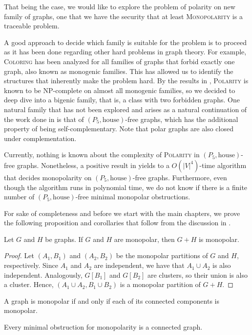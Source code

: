 That being the case, we would like to explore the problem of polarity on new
family of graphs, one that we have the security that at least
\textsc{Monopolarity} is a traceable problem.

A good approach to decide which family is suitable for the problem is to proceed
as it has been done regarding other hard problems in graph theory. For example,
\textsc{Coloring} has been analyzed for all families of graphs that forbid
exactly one graph, also known as monogenic families. This has allowed us to
identify the structures that inherently make the problem hard. By the results in
\cite{Le2014}, \textsc{Polarity} is known to be NP-complete on almost all
monogenic families, so we decided to deep dive into a bigenic family, that is, a
class with two forbidden graphs. One natural family that has not been explored
and arises as a natural continuation of the work done in \cite{chordal,ekim2008}
is that of $(P_5,\text{house})$-free graphs, which has the additional property
of being self-complementary. Note that polar graphs are also closed under
complementation.

Currently, nothing is known about the complexity of \textsc{Polarity} in
$(P_5,\text{house})$-free graphs. Nonetheless, a positive result in
\cite{Le2014} yields to a $O(|V|^4)$-time algorithm that decides monopolarity on
$(P_5,\text{house})$-free graphs. Furthermore, even though the algorithm runs in
polynomial time, we do not know if there is a finite number of
$(P_5,\text{house})$-free minimal monopolar obstructions.

For sake of completeness and before we start with the main chapters, we prove
the following proposition and corollaries that follow from the discussion in
.

\begin{proposition}
\label{pro:additive}
    Let $G$ and $H$ be graphs.   If $G$ and $H$ are monopolar, then $G+H$ is
    monopolar.
\end{proposition}
\begin{proof}
    Let $(A_1, B_1)$ and $(A_2, B_2)$ be the monopolar partitions of $G$ and
    $H$, respectively.   Since $A_1$ and $A_2$ are independent, we have that
    $A_1 \cup A_2$ is also independent.   Analogously, $G[B_1]$ and $G[B_2]$ are
    clusters, so their union is also a cluster.   Hence, $(A_1 \cup A_2, B_1
    \cup B_2)$ is a monopolar partition of $G+H$.
    
\end{proof}

\begin{corollary}
    A graph is monopolar if and only if each of its connected components is
    monopolar.
\end{corollary}

\begin{corollary}
    Every minimal obstruction for monopolarity is a connected graph.
\end{corollary}
